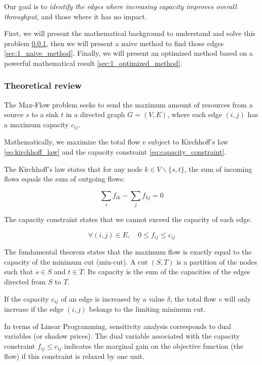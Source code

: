 \documentclass[12pt, openany]{article}
\begin{document}
Our goal is to \emph{identify the edges where increasing capacity improves overall throughput}, and those where it has no impact.

First, we will present the mathematical background to understand and solve this problem \ref{sec:1_theoretical_review}, then we will present a naive method to find those edges \ref{sec:1_naive_method}. Finally, we will present an optimized method based on a powerful mathematical result \ref{sec:1_optimized_method}.

\subsubsection{Theoretical review}\label{sec:1_theoretical_review}

The Max-Flow problem seeks to send the maximum amount of resources from a source $s$ to a sink $t$ in a directed graph $G=(V,E)$, where each edge $(i,j)$ has a maximum capacity $c_{ij}$.

Mathematically, we maximize the total flow $v$ subject to Kirchhoff's law \eqref{eq:kirchhoff_law} and the capacity constraint \eqref{eq:capacity_constraint}.

The Kirchhoff's law states that for any node $k \in V \backslash \{s,t\}$, the sum of incoming flows equals the sum of outgoing flows:

\begin{equation}\label{eq:kirchhoff_law}
    \sum_i f_{ik} - \sum_j f_{kj} = 0
\end{equation}

The capacity constraint states that we cannot exceed the capacity of each edge.

\begin{equation}\label{eq:capacity_constraint}
    \forall (i,j) \in E, \quad 0 \leq f_{ij} \leq c_{ij}
\end{equation}

The fundamental theorem states that the maximum flow is exactly equal to the capacity of the minimum cut (min-cut). A cut $(S,T)$ is a partition of the nodes such that $s \in S$ and $t\in T$. Its capacity is the sum of the capacities of the edges directed from $S$ to $T$.

If the capacity $c_{ij}$ of an edge is increased by a value $\delta$, the total flow $v$ will only increase if the edge $(i,j)$ belongs to the limiting minimum cut.

In terms of Linear Programming, sensitivity analysis corresponds to dual variables (or shadow prices). The dual variable associated with the capacity constraint $f_{ij} \leq c_{ij}$ indicates the marginal gain on the objective function (the flow) if this constraint is relaxed by one unit.
\end{document}
